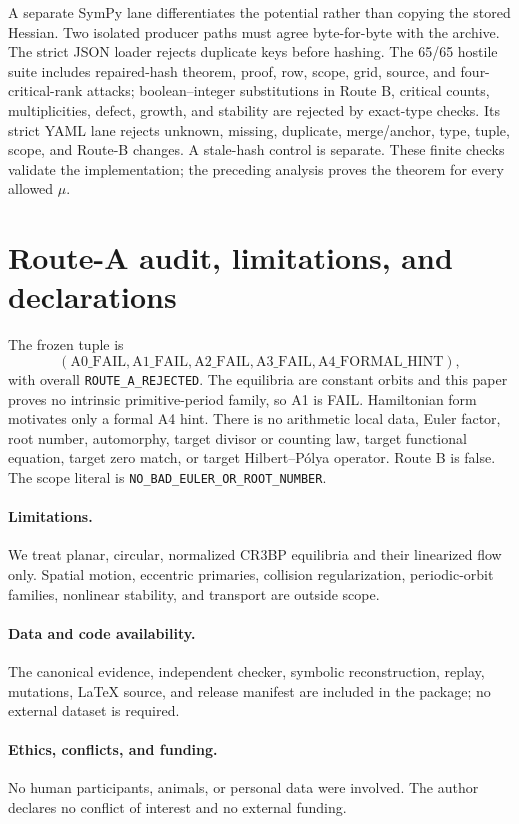 \documentclass[10pt]{article}
\begin{document}
A separate SymPy lane differentiates the potential rather than copying the
stored Hessian.  Two isolated producer paths must agree byte-for-byte with
the archive.  The strict JSON loader rejects duplicate keys before hashing.
The 65/65 hostile suite includes repaired-hash theorem, proof, row, scope, grid,
source, and four-critical-rank attacks; boolean--integer substitutions in
Route B, critical counts, multiplicities, defect, growth, and stability are
rejected by exact-type checks.  Its strict YAML lane rejects unknown, missing,
duplicate, merge/anchor, type, tuple, scope, and Route-B changes.  A stale-hash
control is separate.  These finite checks validate the implementation; the
preceding analysis proves the theorem for every allowed $\mu$.

\section{Route-A audit, limitations, and declarations}
The frozen tuple is
\[
 (\mathrm{A0\_FAIL},\mathrm{A1\_FAIL},\mathrm{A2\_FAIL},
  \mathrm{A3\_FAIL},\mathrm{A4\_FORMAL\_HINT}),
\]
with overall \texttt{ROUTE\_A\_REJECTED}.  The equilibria are constant
orbits and this paper proves no intrinsic primitive-period family, so A1 is
FAIL.  Hamiltonian form motivates only a formal A4 hint.  There is no
arithmetic local data, Euler factor, root number, automorphy, target divisor
or counting law, target functional equation, target zero match, or target
Hilbert--P\'olya operator.  Route B is false.  The scope literal is
\texttt{NO\_BAD\_EULER\_OR\_ROOT\_NUMBER}.

\paragraph{Limitations.}
We treat planar, circular, normalized CR3BP equilibria and their linearized
flow only.  Spatial motion, eccentric primaries, collision regularization,
periodic-orbit families, nonlinear stability, and transport are outside
scope.

\paragraph{Data and code availability.}
The canonical evidence, independent checker, symbolic reconstruction,
replay, mutations, LaTeX source, and release manifest are included in the
package; no external dataset is required.

\paragraph{Ethics, conflicts, and funding.}
No human participants, animals, or personal data were involved.  The author
declares no conflict of interest and no external funding.
\end{document}
